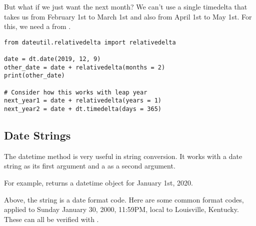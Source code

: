 But what if we just want the next month? We can't use a single timedelta that takes us from February 1st to March 1st and also from April 1st to May 1st. For this, we need a  from .

\begin{lstlisting}
from dateutil.relativedelta import relativedelta

date = dt.date(2019, 12, 9)
other_date = date + relativedelta(months = 2)
print(other_date)

# Consider how this works with leap year
next_year1 = date + relativedelta(years = 1)
next_year2 = date + dt.timedelta(days = 365)
\end{lstlisting}



\subsection{Date Strings}

The datetime  method is very useful in string conversion. It works with a date string as its first argument and a  as a second argument. 

For example,  returns a datetime object for January 1st, 2020. 

Above, the string  is a date format code. Here are some common format codes, applied to Sunday January 30, 2000, 11:59PM, local to Louisville, Kentucky. These can all be verified with .

